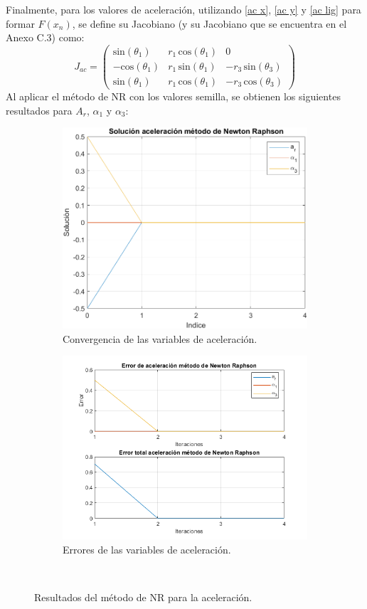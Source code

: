 \documentclass[12pt]{article}
\begin{document}
Finalmente, para los valores de aceleración, utilizando \eqref{ac x}, \eqref{ac y} y \eqref{ac lig} para formar $F(x_n)$, se define su Jacobiano (y su Jacobiano que se encuentra en el Anexo C.3) como:
\footnotesize
\begin{equation}
J_{ac}=\left(\begin{array}{ccc}
\mathrm{sin}\left(\theta_1 \right) & r_1 \,\mathrm{cos}\left(\theta_1 \right) & 0\\
-\mathrm{cos}\left(\theta_1 \right) & r_1 \,\mathrm{sin}\left(\theta_1 \right) & -r_3 \,\mathrm{sin}\left(\theta_3 \right)\\
\mathrm{sin}\left(\theta_1 \right) & r_1 \,\mathrm{cos}\left(\theta_1 \right) & -r_3 \,\mathrm{cos}\left(\theta_3 \right)
\end{array}\right)
    \label{jacobiano ac}
\end{equation}
\normalsize
Al aplicar el método de NR con los valores semilla, se obtienen los siguientes resultados para $A_r$, $\alpha_1$ y $\alpha_3$:
\vspace{-10pt}
\begin{figure}[H]
\centering
  \begin{subfigure}[b]{0.49\textwidth}
    \includegraphics[width=7 cm, height=7 cm, keepaspectratio]{Implementacion/solucion ace NR.png}
    \caption{Convergencia de las variables de aceleración.}
    \label{}
  \end{subfigure}
  \hfill
  \begin{subfigure}[b]{0.49\textwidth}
    \includegraphics[width=7.5 cm, height=7.5 cm, keepaspectratio]{Implementacion/error ace NR.png}
    \caption{Errores de las variables de aceleración.}
    \label{}
  \end{subfigure}\\
      \vspace{10pt}
  \caption{Resultados del método de NR para la aceleración.}
\end{figure}
\end{document}
